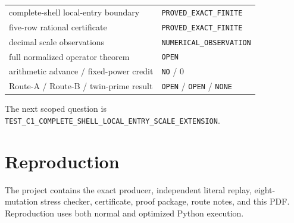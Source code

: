 \documentclass[11pt]{article}
\begin{document}
\begin{center}
\begin{tabular}{@{}ll@{}}
\toprule
complete-shell local-entry boundary & \texttt{PROVED\_EXACT\_FINITE}\\
five-row rational certificate & \texttt{PROVED\_EXACT\_FINITE}\\
decimal scale observations & \texttt{NUMERICAL\_OBSERVATION}\\
full normalized operator theorem & \texttt{OPEN}\\
arithmetic advance / fixed-power credit & \texttt{NO} / 0\\
Route-A / Route-B / twin-prime result & \texttt{OPEN} / \texttt{OPEN} / \texttt{NONE}\\
\bottomrule
\end{tabular}
\end{center}

The next scoped question is
\texttt{TEST\_C1\_COMPLETE\_SHELL\_LOCAL\_ENTRY\_SCALE\_EXTENSION}.

\section*{Reproduction}
The project contains the exact producer, independent literal replay,
eight-mutation stress checker, certificate, proof package, route notes, and
this PDF.  Reproduction uses both normal and optimized Python execution.
\end{document}
